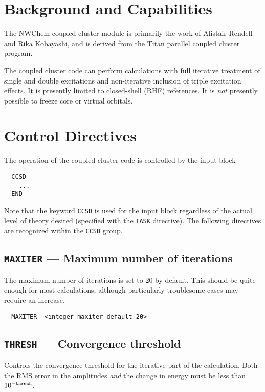 \label{sec:ccsd}

\section{Background and Capabilities}

The NWChem coupled cluster module is primarily the work of Alistair
Rendell and Rika Kobayashi, and is derived from the Titan parallel
coupled cluster program.

The coupled cluster code can perform calculations with full iterative
treatment of single and double excitations and non-iterative inclusion
of triple excitation effects.  It is presently limited to closed-shell
(RHF) references.  It is {\em not} presently possible to freeze core or
virtual orbitals.

\section{Control Directives}

The operation of the coupled cluster code is controlled by the input
block
\begin{verbatim}
  CCSD
    ...
  END
\end{verbatim}
Note that the keyword \verb+CCSD+ is used for the input block
regardless of the actual level of theory desired (specified with the
\verb+TASK+ directive).  The following directives are recognized
within the \verb+CCSD+ group.

\subsection{{\tt MAXITER} --- Maximum number of iterations}

The maximum number of iterations is set to 20 by default.  This should
be quite enough for most calculations, although particularly
troublesome cases may require an increase.

\begin{verbatim}
  MAXITER  <integer maxiter default 20>
\end{verbatim}

\subsection{{\tt THRESH} --- Convergence threshold}

Controls the convergence threshold for the iterative part of the
calculation.  Both the RMS error in the amplitudes {\em and} the
change in energy must be less than $10^{-{\tt thresh}}$.


